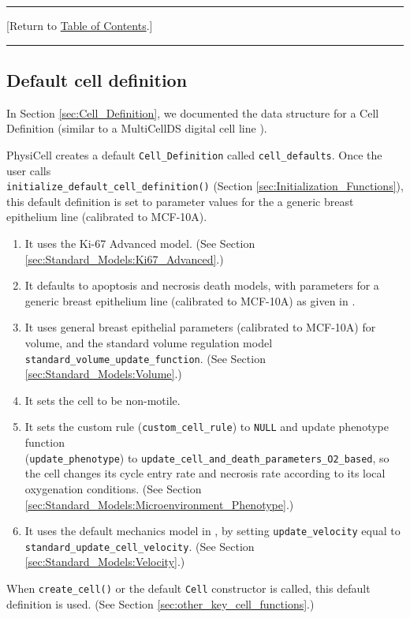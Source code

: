 \documentclass[12pt]{article}
\renewcommand{\v}{\verb}
\newcommand{\blue}[1]{\textcolor{blue}{#1}}
\newcommand{\DONE}{}%
\newcommand{\TOClink}{\begin{center}\hrule\vskip-10pt\phantom{.}\hfill[Return to \hyperlink{TOC}{Table of Contents}.]\hfill\phantom{.}\vskip3pt\hrule\end{center}}
\begin{document}
\TOClink 

\subsection{Default cell definition \DONE}
\label{sec:cell_definition_default}
In Section \ref{sec:Cell_Definition}, we documented the 
data structure for a Cell Definition (similar to a MultiCellDS 
digital cell line \cite{ref:MultiCellDS}).

PhysiCell creates a default \v|Cell_Definition| called 
\v|cell_defaults|. Once the 
user calls \\
\v|initialize_default_cell_definition()| (Section 
\ref{sec:Initialization_Functions}), this 
default definition is set to parameter values for the 
a generic breast epithelium line (calibrated to MCF-10A).  
\begin{enumerate} 
\item 
It uses the Ki-67 Advanced model. (See Section \ref{sec:Standard_Models:Ki67_Advanced}.) 
\item 
It defaults to apoptosis and necrosis death models, 
with parameters for 
a generic breast epithelium line (calibrated to MCF-10A) 
as given in \cite{ref:PhysiCell}. 
\item 
It uses general breast epithelial parameters (calibrated to MCF-10A) 
for volume, and 
the standard volume regulation model \\
\v|standard_volume_update_function|. (See Section \ref{sec:Standard_Models:Volume}.) 
\item 
It sets the cell to be non-motile. 
\item 
It sets the custom rule (\v|custom_cell_rule|) to \v|NULL| and 
update phenotype function \\
(\v|update_phenotype|) to 
\v|update_cell_and_death_parameters_O2_based|, so the cell 
changes its cycle entry rate and necrosis 
rate according to its local oxygenation conditions. 
(See Section \ref{sec:Standard_Models:Microenvironment_Phenotype}.) 
\item 
It uses the default mechanics model in \cite{ref:PhysiCell}, 
by setting 
\v|update_velocity| equal to \\ 
\v|standard_update_cell_velocity|. 
(See Section \ref{sec:Standard_Models:Velocity}.) 
\end{enumerate}

When \v|create_cell()| or the default \v|Cell| constructor is called, 
this default definition is used. 
(See Section \ref{sec:other_key_cell_functions}.) 
\end{document}
